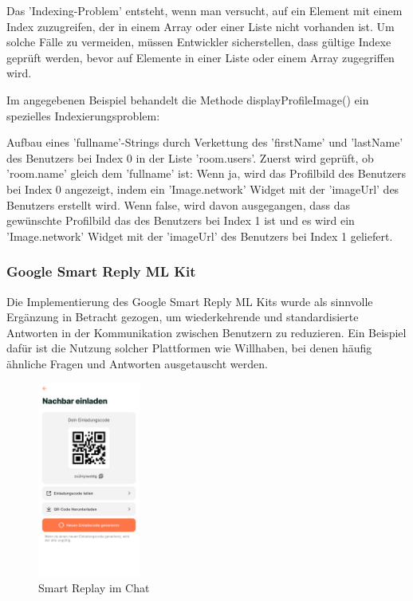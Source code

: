 Das 'Indexing-Problem' entsteht, wenn man versucht, auf ein Element mit einem Index zuzugreifen, der in einem Array oder einer Liste nicht vorhanden ist. Um solche Fälle zu vermeiden, müssen Entwickler sicherstellen, dass gültige Indexe geprüft werden, bevor auf Elemente in einer Liste oder einem Array zugegriffen wird.

Im angegebenen Beispiel behandelt die Methode displayProfileImage() ein spezielles Indexierungsproblem:

Aufbau eines 'fullname'-Strings durch Verkettung des 'firstName' und 'lastName' des Benutzers bei Index 0 in der Liste 'room.users'.
Zuerst wird geprüft, ob 'room.name' gleich dem 'fullname' ist:
Wenn ja, wird das Profilbild des Benutzers bei Index 0 angezeigt, indem ein 'Image.network' Widget mit der 'imageUrl' des Benutzers erstellt wird.
Wenn false, wird davon ausgegangen, dass das gewünschte Profilbild das des Benutzers bei Index 1 ist und es wird ein 'Image.network' Widget mit der 'imageUrl' des Benutzers bei Index 1 geliefert.


\subsubsection{Google Smart Reply ML Kit}
Die Implementierung des Google Smart Reply ML Kits wurde als sinnvolle Ergänzung in Betracht gezogen, um wiederkehrende und standardisierte Antworten in der Kommunikation zwischen Benutzern zu reduzieren. Ein Beispiel dafür ist die Nutzung solcher Plattformen wie Willhaben, bei denen häufig ähnliche Fragen und Antworten ausgetauscht werden.

\begin{figure}[H]
  \centering
  \includegraphics[width=0.3\textwidth]{pics/einladecode-page.png}
  \caption{Smart Replay im Chat}
  \label{fig:einladecode}
\end{figure}

